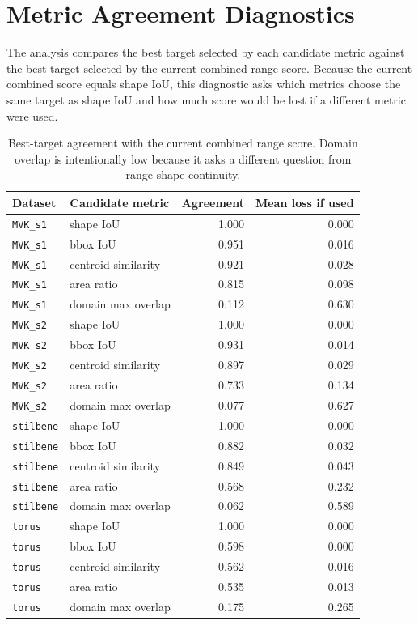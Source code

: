 \documentclass{vgtc}
\begin{document}
\section{Metric Agreement Diagnostics}

The analysis compares the best target selected by each candidate metric against the best target selected by the current combined range score. Because the current combined score equals shape IoU, this diagnostic asks which metrics choose the same target as shape IoU and how much score would be lost if a different metric were used.

\begin{table}[t]
  \centering
  \caption{Best-target agreement with the current combined range score. Domain overlap is intentionally low because it asks a different question from range-shape continuity.}
  \label{tab:supp-metric-agreement}
  \begin{tabular}{llrr}
    \toprule
    Dataset & Candidate metric & Agreement & Mean loss if used \\
    \midrule
    \texttt{MVK\_s1} & shape IoU & 1.000 & 0.000 \\
    \texttt{MVK\_s1} & bbox IoU & 0.951 & 0.016 \\
    \texttt{MVK\_s1} & centroid similarity & 0.921 & 0.028 \\
    \texttt{MVK\_s1} & area ratio & 0.815 & 0.098 \\
    \texttt{MVK\_s1} & domain max overlap & 0.112 & 0.630 \\
    \texttt{MVK\_s2} & shape IoU & 1.000 & 0.000 \\
    \texttt{MVK\_s2} & bbox IoU & 0.931 & 0.014 \\
    \texttt{MVK\_s2} & centroid similarity & 0.897 & 0.029 \\
    \texttt{MVK\_s2} & area ratio & 0.733 & 0.134 \\
    \texttt{MVK\_s2} & domain max overlap & 0.077 & 0.627 \\
    \texttt{stilbene} & shape IoU & 1.000 & 0.000 \\
    \texttt{stilbene} & bbox IoU & 0.882 & 0.032 \\
    \texttt{stilbene} & centroid similarity & 0.849 & 0.043 \\
    \texttt{stilbene} & area ratio & 0.568 & 0.232 \\
    \texttt{stilbene} & domain max overlap & 0.062 & 0.589 \\
    \texttt{torus} & shape IoU & 1.000 & 0.000 \\
    \texttt{torus} & bbox IoU & 0.598 & 0.000 \\
    \texttt{torus} & centroid similarity & 0.562 & 0.016 \\
    \texttt{torus} & area ratio & 0.535 & 0.013 \\
    \texttt{torus} & domain max overlap & 0.175 & 0.265 \\
    \bottomrule
  \end{tabular}
\end{table}
\end{document}
